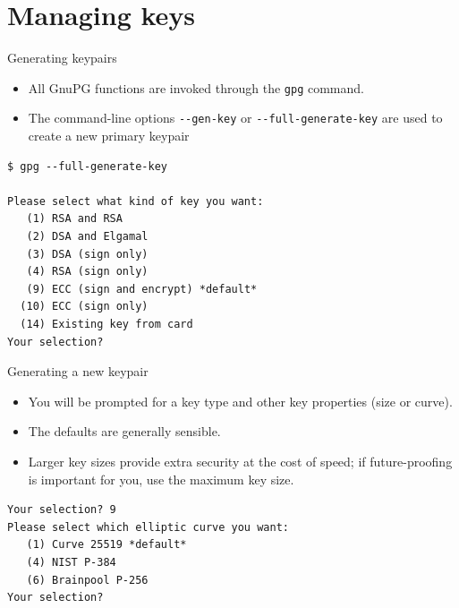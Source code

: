 \documentclass[
mode=present,
paper=smartboard,
size=20pt,
]{powerdot}
\newcommand\vsp{\vspace{-16mm}}
\newcommand{\clopt}[1]{\texttt{{-}#1}}
\begin{document}
\section{Managing keys}

\begin{slide}[method=direct]{Generating keypairs}
  \begin{itemize}
  \item All GnuPG functions are invoked through the \texttt{gpg} command.
  \item The command-line options \clopt{-gen-key} or
    \clopt{-full-generate-key} are used to create a new primary
    keypair
  \end{itemize}
\vsp
\begin{verbatim}
$ gpg --full-generate-key

Please select what kind of key you want:
   (1) RSA and RSA
   (2) DSA and Elgamal
   (3) DSA (sign only)
   (4) RSA (sign only)
   (9) ECC (sign and encrypt) *default*
  (10) ECC (sign only)
  (14) Existing key from card
Your selection?
\end{verbatim}
\end{slide}

\begin{slide}[method=direct,toc=]{Generating a new keypair}
  \begin{itemize}
  \item You will be prompted for a key type and other key properties
    (size or curve).
  \item The defaults are generally sensible.
  \item Larger key sizes provide extra security at the cost of speed;
    if future-proofing is important for you, use the maximum key size.
  \end{itemize}
\begin{verbatim}
Your selection? 9
Please select which elliptic curve you want:
   (1) Curve 25519 *default*
   (4) NIST P-384
   (6) Brainpool P-256
Your selection?
\end{verbatim}
\end{slide}
\end{document}
